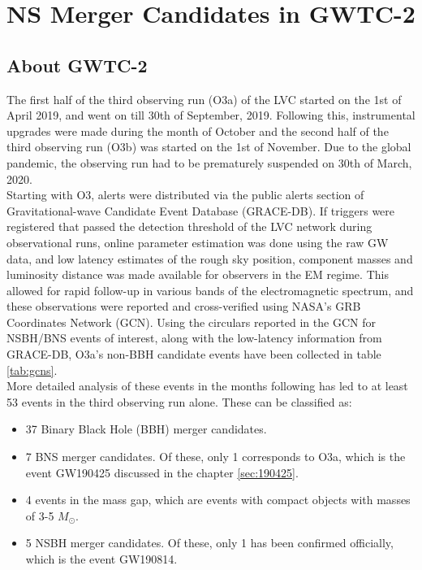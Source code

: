 \chapter{NS Merger Candidates in GWTC-2}\label{ch:candidates}

\section{About GWTC-2}

    The first half of the third observing run (O3a) of the LVC started on the 1st of
    April 2019, and went on till 30th of September, 2019.  Following this, instrumental
    upgrades were made during the month of October and the second half of the third
    observing run (O3b) was started on the 1st of November. Due to the global pandemic,
    the observing run had to be prematurely suspended on 30th of March, 2020.\\
    Starting with O3, alerts were distributed via the public alerts section of
    Gravitational-wave Candidate Event Database (GRACE-DB). If triggers were registered
    that passed the detection threshold of the LVC network during observational runs,
    online parameter estimation was done using the raw GW data, and low latency
    estimates of the rough sky position, component masses and luminosity distance was
    made available for observers in the EM regime. This allowed for rapid follow-up in
    various bands of the electromagnetic spectrum, and these observations were reported
    and cross-verified using NASA's GRB Coordinates Network (GCN). Using the circulars
    reported in the GCN for NSBH/BNS events of interest, along with the low-latency
    information from GRACE-DB, O3a's non-BBH candidate events have been collected in
    table \ref{tab:gcns}.\\
    More detailed analysis of these events in the months following has led to at least
    53 events in the third observing run alone. These can be classified as:
    \begin{itemize}

        \item 37 Binary Black Hole (BBH) merger candidates.

        \item 7 BNS merger candidates. Of these, only 1 corresponds to O3a, which is the
            event GW190425 discussed in the chapter \ref{sec:190425}.

        \item 4 events in the mass gap, which are events with compact objects with
            masses of 3-5 $M_{\odot}$.

        \item 5 NSBH merger candidates. Of these, only 1 has been confirmed officially,
            which is the event GW190814.

    \end{itemize}

